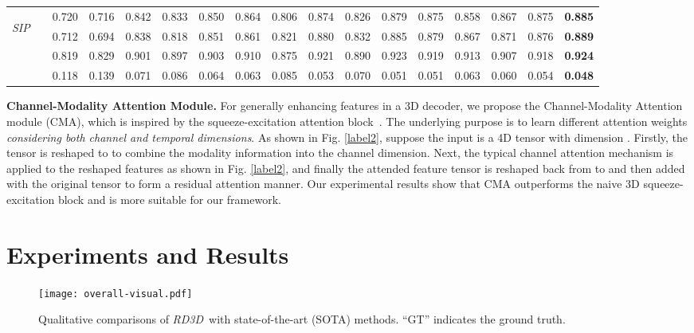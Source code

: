 \documentclass[letterpaper]{article}
\def\ourmodel{\emph{RD3D}}
\begin{document}
\begin{table*}[t!]
\begin{tabular}{lr|cccccccccccccc||c}
\multirow{4}{*}{\begin{sideways}\textit{SIP}\end{sideways}}
&  & 0.720 & 0.716 & 0.842 & 0.833 &0.850 & 0.864 & 0.806 &0.874 &0.826 & 0.879 &0.875 &0.858 &0.867 &0.875  &\bf{0.885} \\
		&  & 0.712 & 0.694 & 0.838 & 0.818 &0.851 & 0.861 & 0.821 &0.880  &0.832 & 0.885 &0.879 &0.867 &0.871  &0.876  &\bf{0.889} \\
		&  & 0.819 & 0.829 & 0.901 & 0.897 &0.903 & 0.910 & 0.875 &0.921 &0.890 &0.923 &0.919 &0.913 &0.907 &0.918  &\bf{0.924}\\
		&   & 0.118 & 0.139 & 0.071 & 0.086 &0.064 & 0.063 & 0.085 &0.053 &0.070 &0.051 &0.051 &0.063 &0.060 &0.054  &\bf{0.048}\\
		\bottomrule
		\hline
	\end{tabular}
	\vspace{-8pt}
\end{table*}

\noindent \textbf{Channel-Modality Attention Module.} For generally enhancing features in a 3D decoder, we propose the Channel-Modality Attention module (CMA), which is inspired by  the squeeze-excitation attention block~\cite{hu2018squeeze}. The underlying purpose is to learn different attention weights \emph{considering both channel and temporal dimensions}. As shown in Fig. \ref{label2}, suppose the input is a 4D tensor with dimension . Firstly, the tensor is reshaped to  to combine the modality information into the channel dimension. Next, the typical channel attention mechanism \cite{hu2018squeeze} is applied to the reshaped features as shown in Fig. \ref{label2}, and finally the attended feature tensor is reshaped back from  to  and then added with the original tensor to form a residual attention manner. Our experimental results show that CMA outperforms the naive 3D squeeze-excitation block and is more suitable for our framework.

\section{Experiments and Results}

\begin{figure*}
	\centering
	\texttt{[image: overall-visual.pdf]}
	\vspace{-0.6cm}
	\caption{\small Qualitative comparisons of \ourmodel~with state-of-the-art (SOTA) methods. ``GT'' indicates the ground truth.}\vspace{-0.3cm}
	\label{fig4}
\end{figure*}
\end{document}

